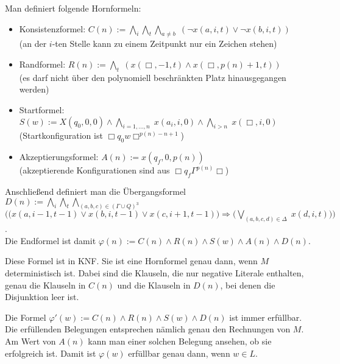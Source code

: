 \begin{Beweis}
    Man definiert folgende Hornformeln:
    \begin{itemize}
        \item
        Konsistenzformel: $C(n) := \bigwedge_i \bigwedge_t \bigwedge_{a \not= b}\;
        (\lnot x(a, i, t) \lor \lnot x(b, i, t))$\\
        (an der $i$-ten Stelle kann zu einem Zeitpunkt nur ein Zeichen stehen)
        
        \item
        Randformel: $R(n) := \bigwedge_t\; (x(\Box, -1, t) \land x(\Box, p(n) + 1, t))$\\
        (es darf nicht über den polynomiell beschränkten Platz hinausgegangen werden)
        
        \item
        Startformel: $S(w) := X(q_0, 0, 0) \land \bigwedge_{i=1,\dotsc,n}\; x(a_i, i, 0) \land
        \bigwedge_{i>n}\; x(\Box, i, 0)$\\
        (Startkonfiguration ist $\Box q_0 w \Box^{p(n)-n+1}$)
        
        \item
        Akzeptierungsformel: $A(n) := x(q_f, 0, p(n))$\\
        (akzeptierende Konfigurationen sind aus $\Box q_f \Gamma^{p(n)} \Box$)
    \end{itemize}
    Anschließend definiert man die Übergangsformel
    $D(n) := \bigwedge_i \bigwedge_t \bigwedge_{(a, b, c) \in (\Gamma \cup Q)^3}$\\
    $\Big(\big(x(a, i - 1, t - 1) \lor x(b, i, t - 1) \lor x(c, i + 1, t - 1)\big) \Rightarrow
    \big(\bigvee_{(a, b, c, d) \in \Delta}\; x(d, i, t)\big)\Big)$.\\
    Die Endformel ist damit $\varphi(n) := C(n) \land R(n) \land S(w) \land A(n) \land D(n)$.
    
    Diese Formel ist in KNF.
    Sie ist eine Hornformel genau dann, wenn $M$ deterministisch ist.
    Dabei sind die Klauseln, die nur negative Literale enthalten, genau die Klauseln in $C(n)$
    und die Klauseln in $D(n)$, bei denen die Disjunktion leer ist.
    
    Die Formel $\varphi'(w) := C(n) \land R(n) \land S(w) \land D(n)$ ist immer erfüllbar.
    Die erfüllenden Belegungen entsprechen nämlich genau den Rechnungen von $M$.
    Am Wert von $A(n)$ kann man einer solchen Belegung ansehen, ob sie erfolgreich ist.
    Damit ist $\varphi(w)$ erfüllbar genau dann, wenn $w \in L$.
\end{Beweis}

